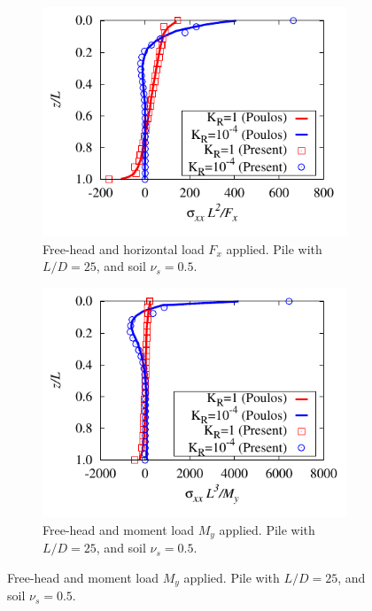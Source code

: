 \documentclass[a4]{article}
\begin{document}
\begin{figure}[tbh!]
	\centering
	\begin{subfigure}[b]{0.48\textwidth}
		\centering
		\includegraphics[width=\textwidth]{floating_a.pdf}
		\caption{Free-head and horizontal load $F_x$ applied. Pile with $L/D=25$, and soil $\nu_s=0.5$.}
		\label{fig:floating_results_a}
	\end{subfigure}
	\begin{subfigure}[b]{0.48\textwidth}
		\centering
		\includegraphics[width=\textwidth]{floating_b.pdf}
		\caption{Free-head and moment load $M_y$ applied. Pile with $L/D=25$, and soil $\nu_s=0.5$.}
		\label{fig:floating_results_b}
	\end{subfigure}

\end{figure}
\end{document}
